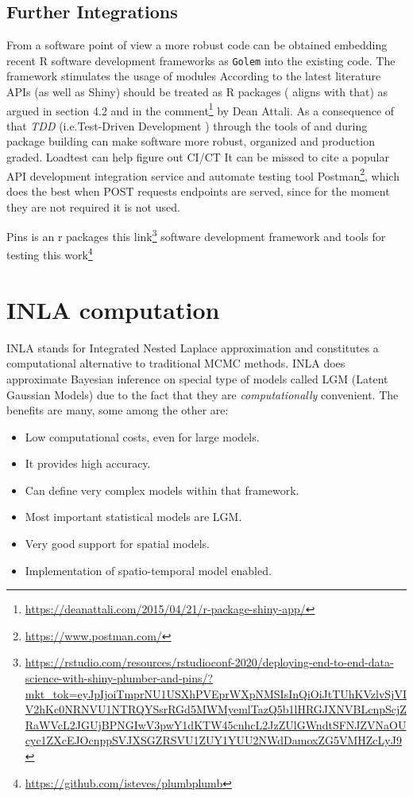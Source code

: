 \documentclass[
  12pt,
  a4paper,
  oneside]{book}
\DeclareRobustCommand{\href}[2]{#2\footnote{\url{#1}}}
\providecommand{\tightlist}{%
  \setlength{\itemsep}{0pt}\setlength{\parskip}{0pt}}
\theoremstyle{definition}
\theoremstyle{definition}
\theoremstyle{definition}
\theoremstyle{remark}
\begin{document}
\hypertarget{further-integrations}{%
\section{Further Integrations}\label{further-integrations}}

From a software point of view a more robust code can be obtained embedding recent R software development frameworks as \texttt{Golem} \citet{colin_fay_2020} into the existing code. The framework stimulates the usage of modules According to the latest literature APIs (as well as Shiny) should be treated as R packages (\citet{plungr} aligns with that) as argued in section 4.2 \citet{colin_fay_2020} and in the \href{https://deanattali.com/2015/04/21/r-package-shiny-app/}{comment} by Dean Attali. As a consequence of that \emph{TDD} (i.e.Test-Driven Development \citet{TDD_2004}) through the tools of \citet{usethis} and \citet{testthat} during package building can make software more robust, organized and production graded. Loadtest \citet{loadtest} can help figure out
CI/CT
It can be missed to cite a popular API development integration service and automate testing tool \href{https://www.postman.com/}{Postman}, which does the best when POST requests endpoints are served, since for the moment they are not required it is not used.

Pins is an r packages \href{https://rstudio.com/resources/rstudioconf-2020/deploying-end-to-end-data-science-with-shiny-plumber-and-pins/?mkt_tok=eyJpIjoiTmprNU1USXhPVEprWXpNMSIsInQiOiJtTUhKVzlvSjVIV2hKc0NRNVU1NTRQYSsrRGd5MWMyemlTazQ5b1lHRGJXNVBLcnpScjZRaWVcL2JGUjBPNGIwV3pwY1dKTW45cnhcL2JzZUlGWndtSFNJZVNaOUcyc1ZXcEJOcnppSVJXSGZRSVU1ZUY1YUU2NWdDamoxZG5VMHZcLyJ9}{this link}
software development framework and tools for testing \href{https://github.com/isteves/plumbplumb}{this work}

\hypertarget{inla}{%
\chapter{INLA computation}\label{inla}}

INLA \citep{Rue2009} stands for Integrated Nested Laplace approximation and constitutes a computational alternative to traditional MCMC methods. INLA does approximate Bayesian inference on special type of models called LGM (Latent Gaussian Models) due to the fact that they are \emph{computationally} convenient. The benefits are many, some among the other are:

\begin{itemize}
\tightlist
\item
  Low computational costs, even for large models.
\item
  It provides high accuracy.
\item
  Can define very complex models within that framework.
\item
  Most important statistical models are LGM.
\item
  Very good support for spatial models.
\item
  Implementation of spatio-temporal model enabled.
\end{itemize}
\end{document}
